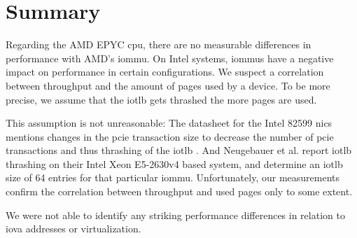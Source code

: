 \section{Summary}
\label{sec:perf_summary}

Regarding the AMD EPYC \ac{cpu}, there are no measurable differences in
performance with AMD's \ac{iommu}. On Intel systems, \acp{iommu} have a negative
impact on performance in certain configurations. We suspect a correlation
between throughput and the amount of pages used by a device. To be more precise,
we assume that the \ac{iotlb} gets thrashed the more pages are used.

This assumption is not unreasonable: The datasheet for the Intel 82599 \acp{nic}
mentions changes in the \ac{pcie} transaction size to decrease the number of
\ac{pcie} transactions and thus thrashing of the \ac{iotlb}
\cite[p.~34]{intel2019datasheet}. And Neugebauer et al.
\cite{neugebauer2018understanding} report \ac{iotlb} thrashing on their Intel
Xeon E5-2630v4 based system, and determine an \ac{iotlb} size of 64 entries for
that particular \ac{iommu}. Unfortunately, our measurements confirm the
correlation between throughput and used pages only to some extent.

We were not able to identify any striking performance differences in relation to
\ac{iova} addresses or virtualization.

